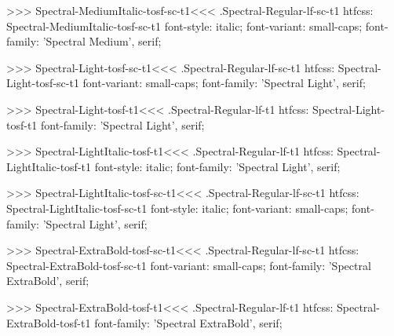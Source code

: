 >>>
\<Spectral-MediumItalic-tosf-sc-t1\><<<
.Spectral-Regular-lf-sc-t1
htfcss:  Spectral-MediumItalic-tosf-sc-t1  font-style: italic; font-variant: small-caps; font-family: 'Spectral Medium', serif;

>>>
\<Spectral-Light-tosf-sc-t1\><<<
.Spectral-Regular-lf-sc-t1
htfcss:  Spectral-Light-tosf-sc-t1  font-variant: small-caps; font-family: 'Spectral Light', serif;

>>>
\<Spectral-Light-tosf-t1\><<<
.Spectral-Regular-lf-t1
htfcss:  Spectral-Light-tosf-t1  font-family: 'Spectral Light', serif;

>>>
\<Spectral-LightItalic-tosf-t1\><<<
.Spectral-Regular-lf-t1
htfcss:  Spectral-LightItalic-tosf-t1  font-style: italic; font-family: 'Spectral Light', serif;

>>>
\<Spectral-LightItalic-tosf-sc-t1\><<<
.Spectral-Regular-lf-sc-t1
htfcss:  Spectral-LightItalic-tosf-sc-t1  font-style: italic; font-variant: small-caps; font-family: 'Spectral Light', serif;

>>>
\<Spectral-ExtraBold-tosf-sc-t1\><<<
.Spectral-Regular-lf-sc-t1
htfcss:  Spectral-ExtraBold-tosf-sc-t1  font-variant: small-caps; font-family: 'Spectral ExtraBold', serif;

>>>
\<Spectral-ExtraBold-tosf-t1\><<<
.Spectral-Regular-lf-t1
htfcss:  Spectral-ExtraBold-tosf-t1  font-family: 'Spectral ExtraBold', serif;

